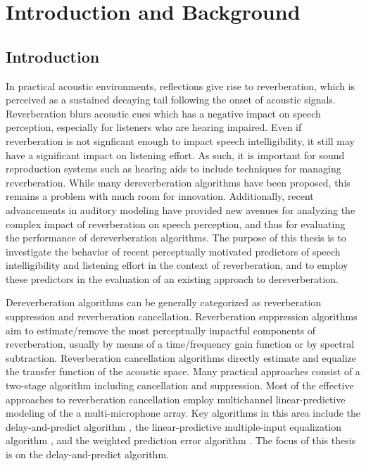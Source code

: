 \chapter{Introduction and Background}

\section{Introduction}

In practical acoustic environments, reflections give rise to reverberation, which is perceived as a sustained decaying tail following the onset of acoustic signals. Reverberation blurs acoustic cues which has a negative impact on speech perception, especially for listeners who are hearing impaired. Even if reverberation is not signficant enough to impact speech intelligibility, it still may have a significant impact on listening effort. As such, it is important for sound reproduction systems such as hearing aids to include techniques for managing reverberation. While many dereverberation algorithms have been proposed, this remains a problem with much room for innovation. Additionally, recent advancements in auditory modeling \citep{bruce2017physiologically} have provided new avenues for analyzing the complex impact of reverberation on speech perception, and thus for evaluating the performance of dereverberation algorithms. The purpose of this thesis is to investigate the behavior of recent perceptually motivated predictors of speech intelligibility and listening effort in the context of reverberation, and to employ these predictors in the evaluation of an existing approach to dereverberation. 

Dereverberation algorithms can be generally categorized as reverberation suppression and reverberation cancellation. Reverberation suppression algorithms aim to estimate/remove the most perceptually impactful components of reverberation, usually by means of a time/frequency gain function or by spectral subtraction. Reverberation cancellation algorithms directly estimate and equalize the transfer function of the acoustic space. Many practical approaches consist of a two-stage algorithm including cancellation and suppression. Most of the effective approaches to reverberation cancellation employ multichannel linear-predictive modeling of the a multi-microphone array. Key algorithms in this area include the delay-and-predict algorithm \citep{triki2006delay}, the linear-predictive multiple-input equalization algorithm \citep[LIME, ][]{delcroix2007precise}, and the weighted prediction error algorithm \citep[WPE, ][]{nakatani2008blind}. The focus of this thesis is on the delay-and-predict algorithm.

